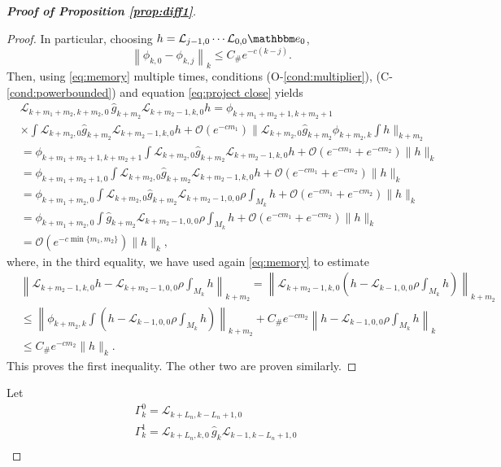 \documentclass{amsart}
\numberwithin{equation}{section}
\newcommand\cL{{\mathcal L}}
\newcommand\cO{{\mathcal O}}
\newcommand{\bbe}{\mathbbm e}
\newcommand{\Const}{C_{\#}}
\begin{document}
\begin{proof}[\bf \em Proof of Proposition \ref{prop:diff1}]
\begin{proof}
In particular, choosing $h=\cL_{j-1,0}\cdots\cL_{0,0}\bbe_0$,
 \begin{equation} \label{eq:project close}
 \left\|\phi_{k,0}-\phi_{k,j}\right\|_{k}\leq  \Const e^{-c(k-j)}.
\end{equation}
 Then, using \eqref{eq:memory} multiple times, conditions (O-\ref{cond:multiplier}), (C-\ref{cond:powerbounded}) and equation \eqref{eq:project close} yields
  \[
 \begin{split}
& \cL_{k+m_1+m_2,k+m_2,0}\,\hat g_{k+m_2}\cL_{k+m_2-1,k,0}h=\phi_{k+m_1+m_2+1,k+m_2+1}\\
&\times\int \cL_{k+m_2,0}\hat g_{k+m_2}\cL_{k+m_2-1,k,0}h
+\cO(e^{-cm_1})\|\cL_{k+m_2,0}\hat g_{k+m_2}\phi_{k+m_2,k}\int h\|_{k+m_2}\\
&=\phi_{k+m_1+m_2+1,k+m_2+1}\int \cL_{k+m_2,0}\hat g_{k+m_2}\cL_{k+m_2-1,k,0}h
+\cO(e^{-cm_1}+e^{-c m_2})\|h\|_{k}\\
&=\phi_{k+m_1+m_2+1,0}\int \cL_{k+m_2,0}\hat g_{k+m_2}\cL_{k+m_2-1,k,0}h
+\cO(e^{-cm_1}+e^{-c m_2})\|h\|_{k}\\
&=\phi_{k+m_1+m_2,0}\int \cL_{k+m_2,0}\hat g_{k+m_2}  \cL_{k+m_2-1, 0,0} \rho  \int_{M_k} h+\cO(e^{-cm_1}+e^{-cm_2})\|h\|_k\\
&=\phi_{k+m_1+m_2,0}\int \hat g_{k+m_2}  \cL_{k+m_2-1, 0,0} \rho  \int_{M_k} h+\cO(e^{-cm_1}+e^{-cm_2})\|h\|_k\\
&=\cO(e^{-c\min\{m_1,m_2\}})\|h\|_k,
 \end{split}
 \]
 where, in the third equality, we have used again \eqref{eq:memory}  to estimate
 \[
 \begin{split}
&\left\| \cL_{k+m_2-1,k,0}h- \cL_{k+m_2-1, 0,0} \rho  \int_{M_k} h\right\|_{k+m_2}
=\left\| \cL_{k+m_2-1,k,0}\left(h- \cL_{k-1, 0,0} \rho  \int_{M_k} h\right)\right\|_{k+m_2}\\
&\leq\left\|\phi_{k+m_2,k}\int \left(h- \cL_{k-1, 0,0} \rho  \int_{M_k} h\right)\right\|_{k+m_2}+\Const e^{-cm_2}\left\|h- \cL_{k-1, 0,0} \rho  \int_{M_k} h\right\|_k\\
&\leq \Const e^{-cm_2}\|h\|_k.
\end{split}
 \]
This proves the first inequality. The other two are proven similarly.
\end{proof}
Let
 \begin{equation}\label{eq:Gamma_PF}
 \begin{split}
& \Gamma^0_k=\cL_{k+L_n,k-L_n+1,0}\\
& \Gamma^1_{k}=\cL_{k+L_n, k,0}\,\hat g_k\cL_{k-1,k-L_n+1,0}\\

\end{split}
\end{equation}
\end{proof}
\end{document}
